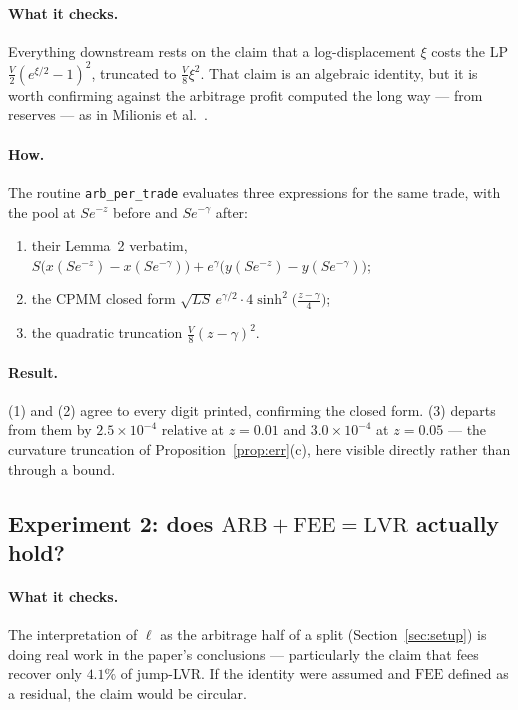 \documentclass[11pt]{article}
\theoremstyle{definition}
\theoremstyle{remark}
\newcommand{\1}{\mathbf{1}}
\begin{document}
\paragraph{What it checks.} Everything downstream rests on the claim that a log-displacement $\xi$ costs the LP $\tfrac{V}{2}(e^{\xi/2}-1)^2$, truncated to $\tfrac{V}{8}\xi^2$. That claim is an algebraic identity, but it is worth confirming against the arbitrage profit computed the long way --- from reserves --- as in Milionis et al.~\cite[Lemma~2]{milionis2023automated}.

\paragraph{How.} The routine \texttt{arb\_per\_trade} evaluates three expressions for the same trade, with the pool at $Se^{-z}$ before and $Se^{-\gamma}$ after:
\begin{enumerate}[leftmargin=2em]
\item their Lemma~2 verbatim, $S\big(x(Se^{-z}) - x(Se^{-\gamma})\big) + e^{\gamma}\big(y(Se^{-z}) - y(Se^{-\gamma})\big)$;
\item the CPMM closed form $\sqrt{LS}\,e^{\gamma/2}\cdot 4\sinh^2\!\big(\tfrac{z-\gamma}{4}\big)$;
\item the quadratic truncation $\tfrac{V}{8}(z-\gamma)^2$.
\end{enumerate}

\paragraph{Result.} (1) and (2) agree to every digit printed, confirming the closed form. (3) departs from them by $2.5\times10^{-4}$ relative at $z = 0.01$ and $3.0\times10^{-4}$ at $z = 0.05$ --- the curvature truncation of Proposition~\ref{prop:err}(c), here visible directly rather than through a bound.

\subsection{Experiment 2: does \texorpdfstring{$\mathrm{ARB} + \mathrm{FEE} = \mathrm{LVR}$}{ARB + FEE = LVR} actually hold?}

\paragraph{What it checks.} The interpretation of $\ell$ as the arbitrage half of a split (Section~\ref{sec:setup}) is doing real work in the paper's conclusions --- particularly the claim that fees recover only $4.1\%$ of jump-LVR. If the identity were assumed and $\mathrm{FEE}$ defined as a residual, the claim would be circular.
\end{document}
